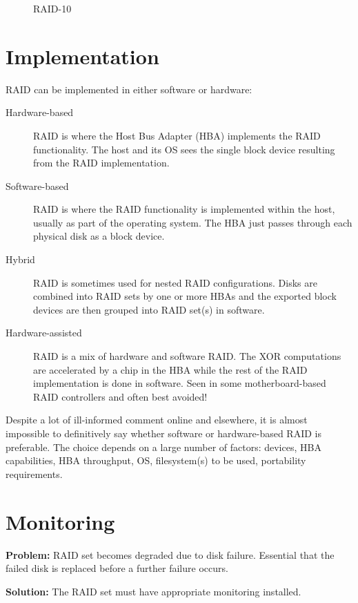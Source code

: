 \begin{figure}
\centering
\caption{RAID-10}
\end{figure}

\section{Implementation}\label{implementation}

RAID can be implemented in either software or hardware:

\begin{description}
\item[Hardware-based]
RAID is where the Host Bus Adapter (HBA) implements the RAID
functionality. The host and its OS sees the single block device
resulting from the RAID implementation.
\item[Software-based]
RAID is where the RAID functionality is implemented within the host,
usually as part of the operating system. The HBA just passes through
each physical disk as a block device.
\item[Hybrid]
RAID is sometimes used for nested RAID configurations. Disks are
combined into RAID sets by one or more HBAs and the exported block
devices are then grouped into RAID set(s) in software.
\item[Hardware-assisted]
RAID is a mix of hardware and software RAID. The XOR computations are
accelerated by a chip in the HBA while the rest of the RAID
implementation is done in software. Seen in some motherboard-based RAID
controllers and often best avoided!
\end{description}

Despite a lot of ill-informed comment online and elsewhere, it is almost
impossible to definitively say whether software or hardware-based RAID
is preferable. The choice depends on a large number of factors: devices,
HBA capabilities, HBA throughput, OS, filesystem(s) to be used,
portability requirements.

\section{Monitoring}\label{monitoring}

\textbf{Problem:} RAID set becomes degraded due to disk failure.
Essential that the failed disk is replaced before a further failure
occurs.

\textbf{Solution:} The RAID set must have appropriate monitoring
installed.

